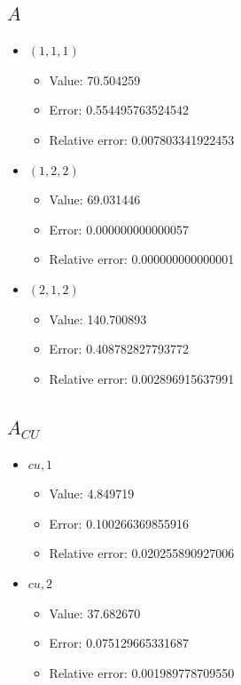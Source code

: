 \documentclass{article}%
\begin{document}
\subsection{$A$}%
\begin{itemize}%
	\item $(1, 1, 1)$%
	\begin{itemize}%
		\item Value: 70.504259%
		\item Error: 0.554495763524542%
		\item Relative error: 0.007803341922453%
	\end{itemize}%
	\item $(1, 2, 2)$%
	\begin{itemize}%
		\item Value: 69.031446%
		\item Error: 0.000000000000057%
		\item Relative error: 0.000000000000001%
	\end{itemize}%
	\item $(2, 1, 2)$%
	\begin{itemize}%
		\item Value: 140.700893%
		\item Error: 0.408782827793772%
		\item Relative error: 0.002896915637991%
	\end{itemize}%
\end{itemize}%
\subsection{$A_{CU}$}%
\begin{itemize}%
	\item $\textit{cu},1$%
	\begin{itemize}%
		\item Value: 4.849719%
		\item Error: 0.100266369855916%
		\item Relative error: 0.020255890927006%
	\end{itemize}%
	\item $\textit{cu},2$%
	\begin{itemize}%
		\item Value: 37.682670%
		\item Error: 0.075129665331687%
		\item Relative error: 0.001989778709550%
	\end{itemize}%
\end{itemize}%
\end{document}
